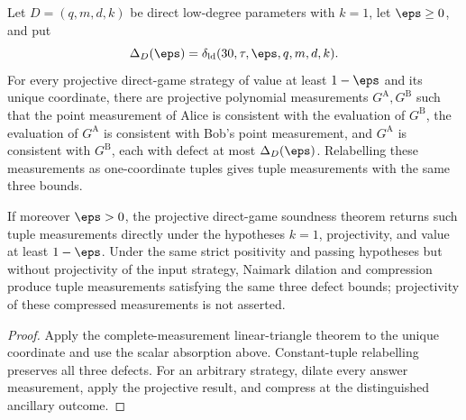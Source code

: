 \begin{theorem}
\label{thm:qld-coefficient-thirty-direct-soundness}
\leanok
{}
Let $D=(q,m,d,k)$ be direct low-degree parameters with $k=1$, let
$\eps\geq0$, and put
\[
 \Delta_D(\eps)=\delta_{\mathrm{ld}}(30,\tau,\eps,q,m,d,k).
\]
For every projective direct-game strategy of value at least $1-\eps$ and its
unique coordinate, there are projective polynomial measurements
$G^{\mathrm A},G^{\mathrm B}$ such that the point measurement of Alice is
consistent with the evaluation of $G^{\mathrm B}$, the evaluation of
$G^{\mathrm A}$ is consistent with Bob's point measurement, and
$G^{\mathrm A}$ is consistent with $G^{\mathrm B}$, each with defect at most
$\Delta_D(\eps)$. Relabelling these measurements as one-coordinate tuples
gives tuple measurements with the same three bounds.

If moreover $\eps>0$, the projective direct-game soundness theorem returns
such tuple measurements directly under the hypotheses $k=1$, projectivity,
and value at least $1-\eps$. Under the same strict positivity and passing
hypotheses but without projectivity of the input strategy, Naimark dilation
and compression produce tuple measurements satisfying the same three defect
bounds; projectivity of these compressed measurements is not asserted.
\end{theorem}
\begin{proof}
\leanok
{}
Apply the complete-measurement linear-triangle theorem to the unique
coordinate and use the scalar absorption above. Constant-tuple relabelling
preserves all three defects. For an arbitrary strategy, dilate every answer
measurement, apply the projective result, and compress at the distinguished
ancillary outcome.
\end{proof}

